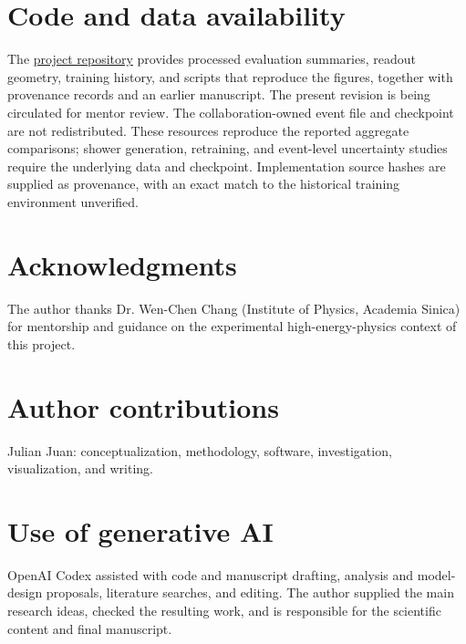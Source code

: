 \documentclass[11pt]{article}
\begin{document}
\section*{Code and data availability}

The \href{https://github.com/JulianAttemptsCoding/fast-mc-paper}{project repository} provides processed evaluation summaries, readout geometry, training history, and scripts that reproduce the figures, together with provenance records and an earlier manuscript. The present revision is being circulated for mentor review. The collaboration-owned event file and checkpoint are not redistributed. These resources reproduce the reported aggregate comparisons; shower generation, retraining, and event-level uncertainty studies require the underlying data and checkpoint. Implementation source hashes are supplied as provenance, with an exact match to the historical training environment unverified.

\section*{Acknowledgments}

The author thanks Dr. Wen-Chen Chang (Institute of Physics, Academia Sinica) for mentorship and guidance on the experimental high-energy-physics context of this project.

\section*{Author contributions}

Julian Juan: conceptualization, methodology, software, investigation, visualization, and writing.

\section*{Use of generative AI}

OpenAI Codex assisted with code and manuscript drafting, analysis and model-design proposals, literature searches, and editing. The author supplied the main research ideas, checked the resulting work, and is responsible for the scientific content and final manuscript.

\printbibliography
\end{document}

